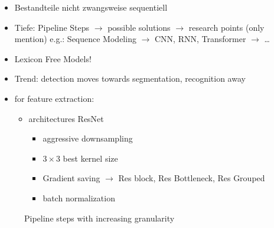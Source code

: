 \begin{itemize}
    \item Bestandteile nicht zwangsweise sequentiell
    \item Tiefe: Pipeline Steps
        $\rightarrow$ possible solutions
        $\rightarrow$ research points (only mention)
        e.g.: Sequence Modeling $\rightarrow$ CNN, RNN, Transformer $\rightarrow$ \ldots
    \item Lexicon Free Models!
    \item Trend: detection moves towards segmentation, recognition away
    \item for feature extraction:
        \begin{itemize}
        \item architectures ResNet
            \begin{itemize}
                \item aggressive downsampling
                \item $3\times3$ best kernel size
                \item Gradient saving $\rightarrow$ Res block, Res Bottleneck, Res Grouped
                \item batch normalization
            \end{itemize}
    \end{itemize}
\end{itemize}

\tikzset{
}

\begin{figure}[ht]
    \centering
\caption{Pipeline steps with increasing granularity\label{fig:pipelineSteps}}
\end{figure}

